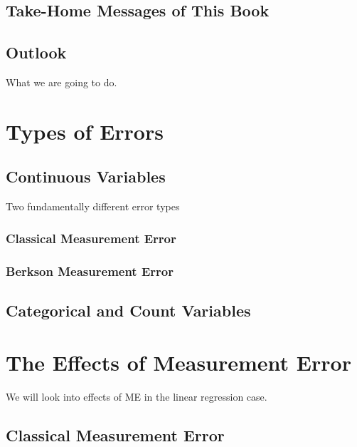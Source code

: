 \documentclass[]{book}
\theoremstyle{definition}
\theoremstyle{definition}
\theoremstyle{definition}
\theoremstyle{remark}
\begin{document}
\section{Take-Home Messages of This
Book}\label{take-home-messages-of-this-book}

\section{Outlook}\label{outlook}

What we are going to do.

\chapter{Types of Errors}\label{errortypes}

\section{Continuous Variables}\label{continuous-variables}

Two fundamentally different error types

\subsection{Classical Measurement
Error}\label{classical-measurement-error}

\subsection{Berkson Measurement Error}\label{berkson-measurement-error}

\section{Categorical and Count
Variables}\label{categorical-and-count-variables}

\chapter{The Effects of Measurement
Error}\label{the-effects-of-measurement-error}

We will look into effects of ME in the linear regression case.

\section{Classical Measurement
Error}\label{classical-measurement-error-1}
\end{document}

